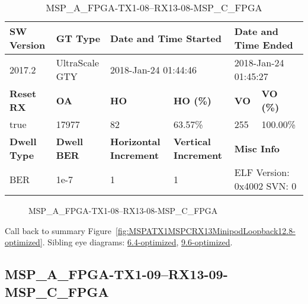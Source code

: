 \begin{table}[h]
\centering
\caption{MSP\_A\_FPGA-TX1-08--RX13-08-MSP\_C\_FPGA}
\label{tab:MSPAFPGATX108RX1308MSPCFPGA12.8-optimized}
\begin{tabular}{@{}|l|l|l|l|l|l|@{}}
\toprule
\textbf{SW Version}                & \textbf{GT Type}   & \multicolumn{2}{l|}{\textbf{Date and Time Started}}            & \multicolumn{2}{l|}{\textbf{Date and Time Ended}}        \\ \midrule
2017.2                       & UltraScale GTY          & \multicolumn{2}{l|}{2018-Jan-24 01:44:46}                   & \multicolumn{2}{l|}{2018-Jan-24 01:45:27}               \\ \midrule
\textbf{Reset RX}                  & \textbf{OA} & \textbf{HO}   & \textbf{HO (\%)} & \textbf{VO} & \textbf{VO (\%)} \\ \midrule
true & 17977        & 82          & 63.57\%        & 255        & 100.00\%       \\ \midrule
\textbf{Dwell Type}                & \textbf{Dwell BER} & \textbf{Horizontal Increment} & \textbf{Vertical Increment}    & \multicolumn{2}{l|}{\textbf{Misc Info}}                  \\ \midrule
BER                            & 1e-7        & 1        & 1           & \multicolumn{2}{l|}{ELF Version: 0x4002 SVN: 0}                         \\ \bottomrule
\end{tabular}
\end{table}

\begin{figure}[h]
\caption{MSP\_A\_FPGA-TX1-08--RX13-08-MSP\_C\_FPGA} \label{fig:MSPAFPGATX108RX1308MSPCFPGA12.8-optimized}
\end{figure}

Call back to summary Figure~\ref{fig:MSPATX1MSPCRX13MinipodLoopback12.8-optimized}.
Sibling eye diagrams: \hyperref[sec:MSPAFPGATX108RX1308MSPCFPGA6.4-optimized]{6.4-optimized}, \hyperref[sec:MSPAFPGATX108RX1308MSPCFPGA9.6-optimized]{9.6-optimized}.

\clearpage
\newpage


\subsection{MSP\_A\_FPGA-TX1-09--RX13-09-MSP\_C\_FPGA}\label{sec:MSPAFPGATX109RX1309MSPCFPGA12.8-optimized}

